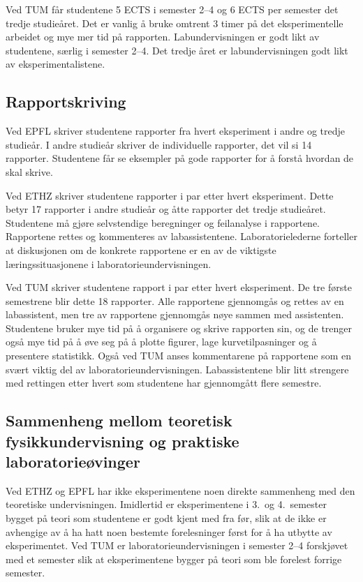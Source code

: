 \documentclass{article}
\begin{document}
Ved TUM får studentene 5 ECTS i semester 2--4 og 6 ECTS per semester det tredje studieåret. Det er vanlig å bruke omtrent 3 timer på det eksperimentelle arbeidet og mye mer tid på rapporten. Labundervisningen er godt likt av studentene, særlig i semester 2--4. Det tredje året er labundervisningen godt likt av eksperimentalistene.

\subsection{Rapportskriving}
Ved EPFL skriver studentene rapporter fra hvert eksperiment i andre og tredje studieår. I andre studieår skriver de individuelle rapporter, det vil si 14 rapporter. Studentene får se eksempler på gode rapporter for å forstå hvordan de skal skrive.

Ved ETHZ skriver studentene rapporter i par etter hvert eksperiment. Dette betyr 17 rapporter i andre studieår og åtte rapporter det tredje studieåret. Studentene må gjøre selvstendige beregninger og feilanalyse i rapportene. Rapportene rettes og kommenteres av labassistentene. Laboratorielederne forteller at diskusjonen om de konkrete rapportene er en av de viktigste læringssituasjonene i laboratorieundervisningen.

Ved TUM skriver studentene rapport i par etter hvert eksperiment. De tre første semestrene blir dette 18 rapporter. Alle rapportene gjennomgås og rettes av en labassistent, men tre av rapportene gjennomgås nøye sammen med assistenten. Studentene bruker mye tid på å organisere og skrive rapporten sin, og de trenger også mye tid på å øve seg på å plotte figurer, lage kurvetilpasninger og å presentere statistikk. Også ved TUM anses kommentarene på rapportene som en svært viktig del av laboratorieundervisningen. Labassistentene blir litt strengere med rettingen etter hvert som studentene har gjennomgått flere semestre.

\subsection{Sammenheng mellom teoretisk fysikkundervisning og praktiske laboratorieøvinger}
Ved ETHZ og EPFL har ikke eksperimentene noen direkte sammenheng med den teoretiske undervisningen. Imidlertid er eksperimentene i 3.~og 4.~semester bygget på teori som studentene er godt kjent med fra før, slik at de ikke er avhengige av å ha hatt noen bestemte forelesninger først for å ha utbytte av eksperimentet. Ved TUM er laboratorieundervisningen i semester 2--4 forskjøvet med et semester slik at eksperimentene bygger på teori som ble forelest forrige semester.
\end{document}
